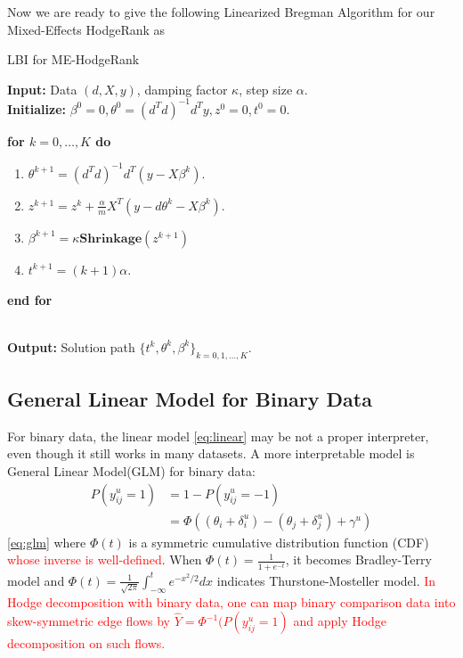 \documentclass[10pt,journal,cspaper,compsoc]{IEEEtran}
\begin{document}
{Now we are ready to give the following Linearized Bregman Algorithm for our Mixed-Effects HodgeRank as
\begin{algorithm}
\caption{LBI for ME-HodgeRank}\label{alg-LBI-LME}
\textbf{Input:} Data $(d,X,y)$, damping factor $\kappa$, step size $\alpha$.\\
\textbf{Initialize:} $\beta^0 = 0,\theta^0 = (d^Td)^{-1}d^Ty,z^0=0,t^0=0$.\\
{\textbf{for $k=0,\dots,K$ do}
\begin{enumerate}
\item $\theta^{k+1} = (d^Td)^{-1}d^T(y - X\beta^k)$. \label{alg2-step1}
\item $z^{k+1}  =z^{k} + \frac{\alpha}{m} X^T(y - d\theta^k - X\beta^k)$.\label{alg2-step2}
\item $\beta^{k+1} = \kappa\mathbf{Shrinkage}(z^{k+1})$
\item $t^{k+1} = (k+1)\alpha$.
\end{enumerate}
\textbf{end for}}\\
\textbf{Output:} Solution path $\{t^k, \theta^k,\beta^k\}_{k= 0,1,\dots,K}$.
\end{algorithm}

\subsection{General Linear Model for Binary Data} \label{sec:glm}
For binary data, the linear model \eqref{eq:linear} may be not a proper interpreter, even though it still works in many datasets. A more interpretable model is General Linear Model(GLM) for binary data:
\begin{align}\label{eq:glm}
P(y^u_{ij} = 1) &= 1-P(y^u_{ij}=-1) \nonumber\\
&= \Phi((\theta_i+\delta_i^u) - (\theta_j+\delta_j^u) + \gamma^u)
\end{align}
\eqref{eq:glm} where $\Phi(t)$ is a symmetric cumulative distribution function (CDF) \textcolor{red}{whose inverse is well-defined}. When $\Phi(t) = \frac{1}{1+e^{-t}}$, it becomes Bradley-Terry model and $\Phi(t) = \frac{1}{\sqrt{2\pi}}\int_{-\infty}^{t}e^{-x^2/2}dx$ indicates Thurstone-Mosteller model. \textcolor{red}{In Hodge decomposition \cite{HodgeRank} with binary data, one can map binary comparison data into skew-symmetric edge flows by $\hat{Y}=\Phi^{-1}(P(y^u_{ij}=1)$ and apply Hodge decomposition on such flows.}

}
\end{document}
